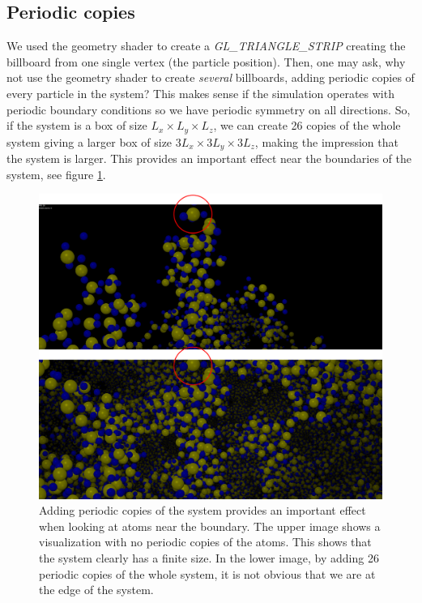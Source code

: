 \subsection{Periodic copies}
We used the geometry shader to create a \textit{GL\_TRIANGLE\_STRIP} creating the billboard from one single vertex (the particle position). Then, one may ask, why not use the geometry shader to create \textit{several} billboards, adding periodic copies of every particle in the system? This makes sense if the simulation operates with periodic boundary conditions so we have periodic symmetry on all directions. So, if the system is a box of size $L_x\times L_y \times L_z$, we can create 26 copies of the whole system giving a larger box of size $3L_x\times 3L_y\times 3L_z$, making the impression that the system is larger. This provides an important effect near the boundaries of the system, see figure \ref{fig:visualization_billboard_periodic_copies}.
\begin{figure}[h]
\begin{center}
\includegraphics[width=\textwidth, trim=0cm 0cm 0cm 0cm, clip]{visualization/figures/periodic_copies.png}
\end{center}
\caption{Adding periodic copies of the system provides an important effect when looking at atoms near the boundary. The upper image shows a visualization with no periodic copies of the atoms. This shows that the system clearly has a finite size. In the lower image, by adding 26 periodic copies of the whole system, it is not obvious that we are at the edge of the system.}
\label{fig:visualization_billboard_periodic_copies}
\end{figure}
